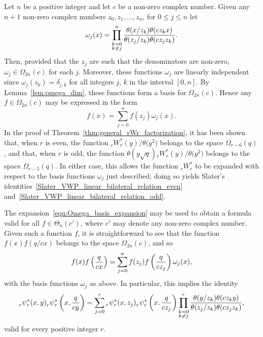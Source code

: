 \documentclass[pdftex]{sigma}
\numberwithin{equation}{section}
\begin{document}
\begin{Remark} \label{rmk:Slater_VWP_linear_bilateral_relations}
Let $n$ be a positive integer and let $c$ be a non-zero complex number. Given any~${n+1}$ non-zero complex numbers $z_0, z_1,\dots, z_n$, for $0 \leq j \leq n$ let
\[ \omega_j(x) = \prod_{\substack{k=0 \\ k \neq j}}^n {\theta(x/z_k) \theta(cz_kx) \over \theta(z_j/z_k) \theta(cz_jz_k)}. \]
Then, provided that the $z_j$ are such that the denominators are non-zero, $\omega_j \in \Omega_{2n}(c)$ for each $j$. Moreover, these functions $\omega_j$ are linearly independent since $\omega_j(z_k) = \delta_{j,k}$ for all integers $j$, $k$ in the interval $[0,n]$. By Lemma~\ref{lem:omega_dim}, these functions form a basis for $\Omega_{2n}(c)$. Hence any $f \in \Omega_{2n}(c)$ may be expressed in the form
\begin{equation} \label{eqn:Omega_basis_expansion}
f(x) = \sum_{j=0}^n f(z_j) \omega_j(x).
\end{equation}
In the proof of Theorem~\ref{thm:general_rWr_factorization}, it has been shown that, when $r$ is even, the function $_r^{}W_r^\ast(y)/\theta\bigl(y^2\bigr)$ belongs to the space $\Omega_{r-6}(q)$, and that, when $r$ is odd, the function $\theta(y\sqrt{q}){}_r^{}W_r^\ast(y)/\theta\bigl(y^2\bigr)$ belongs to the space $\Omega_{r-5}(q)$. In either case, this allows the function $_r^{}W_r^\ast$ to be expanded with respect to the basis functions $\omega_j$ just described; doing so yields Slater's identities~\eqref{Slater_VWP_linear_bilateral_relation_even} and~\eqref{Slater_VWP_linear_bilateral_relation_odd}.

The expansion~\eqref{eqn:Omega_basis_expansion} may be used to obtain a formula valid for all $f \in \Theta_n(c')$, where $c'$ may denote any non-zero complex number. Given such a function $f$, it is straightforward to see that the function $f(x)f(q/cx)$ belongs to the space $\Omega_{2n}(c)$, and so
\[ f(x)f\left({q \over cx}\right) = \sum_{j=0}^n f(z_j)f\left({q \over cz_j}\right) \omega_j(x), \]
with the basis functions $\omega_j$ as above. In particular, this implies the identity
\[ {}_r^{}\psi_r^\ast(x,y) {}_r^{}\psi_r^\ast\left(x,{q \over cy}\right) = \sum_{j=0}^r {}_r^{}\psi_r^\ast(x,z_j) {}_r^{}\psi_r^\ast\left(x,{q \over cz_j}\right) \prod_{\substack{k=0 \\ k \neq j}}^r {\theta(y/z_k) \theta(cz_ky) \over \theta(z_j/z_k) \theta(cz_jz_k)}, \]
valid for every positive integer $r$.
\end{Remark}
\end{document}
